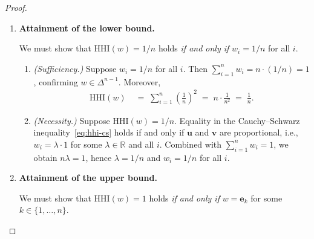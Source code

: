 \documentclass[12pt,openany]{book}
\newcommand{\bfw}{\mathbf{w}}
\newcommand{\bfe}{\mathbf{e}}
\numberwithin{equation}{chapter}
\theoremstyle{plain}
\theoremstyle{definition}
\theoremstyle{remark}
\def\bfw{w}%
\begin{document}
\begin{proof}
\begin{enumerate}
        By Step~1, $w_i \in [0,1]$ for every $i$.
        Therefore $w_i^2 \leq w_i \cdot 1 = w_i$ for each $i$
        (since multiplying $w_i \leq 1$ on both sides of
        $w_i \geq 0$ yields $w_i^2 \leq w_i$).
        Summing over all $i$:
        \begin{align}
          \mathrm{HHI}(\bfw)
          \;=\; \sum_{i=1}^{n} w_i^2
          &\;\leq\; \sum_{i=1}^{n} w_i
          \;=\; 1.
          \label{eq:hhi-ub}
        \end{align}

  \item \textbf{Attainment of the lower bound.}

        We must show that $\mathrm{HHI}(\bfw) = 1/n$ holds
        \emph{if and only if} $w_i = 1/n$ for all $i$.

        \begin{enumerate}
          \item \emph{(Sufficiency.)}
                Suppose $w_i = 1/n$ for all $i$.
                Then $\sum_{i=1}^{n}w_i = n \cdot (1/n) = 1$,
                confirming $\bfw \in \Delta^{n-1}$.  Moreover,
                \begin{align}
                  \mathrm{HHI}(\bfw)
                  &\;=\; \sum_{i=1}^{n} \left(\frac{1}{n}\right)^2
                  \;=\; n \cdot \frac{1}{n^2}
                  \;=\; \frac{1}{n}.
                  \label{eq:hhi-lb-suff}
                \end{align}

          \item \emph{(Necessity.)}
                Suppose $\mathrm{HHI}(\bfw) = 1/n$.
                Equality in the Cauchy--Schwarz
                inequality~\eqref{eq:hhi-cs} holds if and only if
                $\mathbf{u}$ and $\mathbf{v}$ are proportional,
                i.e., $w_i = \lambda \cdot 1$ for some
                $\lambda \in \mathbb{R}$ and all $i$.
                Combined with $\sum_{i=1}^{n} w_i = 1$, we obtain
                $n\lambda = 1$, hence $\lambda = 1/n$ and
                $w_i = 1/n$ for all $i$.
        \end{enumerate}

  \item \textbf{Attainment of the upper bound.}

        We must show that $\mathrm{HHI}(\bfw) = 1$ holds
        \emph{if and only if} $\bfw = \bfe_k$ for some
        $k \in \{1,\ldots,n\}$.


\end{enumerate}
\end{proof}
\end{document}
